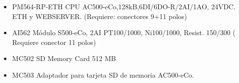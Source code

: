 \begin{itemize}
	\item{PM564-RP-ETH CPU AC500-eCo,128kB,6DI/6DO-R/2AI/1AO, 24VDC. ETH y WEBSERVER. (Requiere: conectores 9+11 polos)}
\item{AI562 Módulo S500-eCo, 2AI PT100/1000, Ni100/1000, Resist. 150/300 ( Requiere conector 11 polos)}
\item{MC502 SD Memory Card 512 MB}
\item{MC503 Adaptador para tarjeta SD de memoria AC500-eCo.}

\end{itemize}

